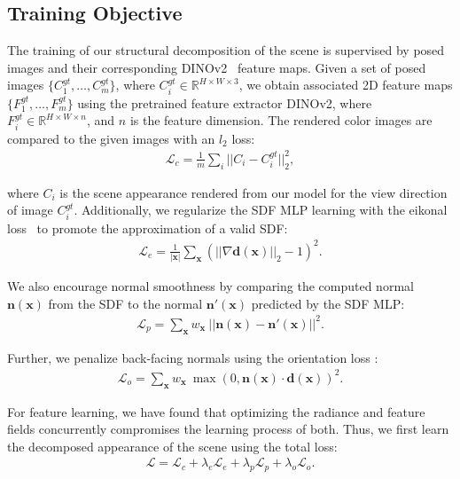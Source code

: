 \subsection{Training Objective}
\label{sec:training_objective}

The training of our structural decomposition of the scene is supervised by posed images and their corresponding DINOv2~\cite{oquab2023dinov2} feature maps. Given a set of posed images $\{C^{gt}_1, \dots, C^{gt}_m\}$, where $C^{gt}_i \in \mathbb{R}^{H \times W \times 3}$, we obtain associated 2D feature maps $\{F^{gt}_1, \dots, F^{gt}_m\}$ using the pretrained feature extractor DINOv2, where $F^{gt}_i \in \mathbb{R}^{H \times W \times n}$, and $n$ is the feature dimension.
The rendered color images are compared to the given images with an $l_2$ loss:
\begin{align}
\mathcal{L}_c = \frac{1}{m} \sum_i { || C_i - C^{gt}_i ||_2^2 },
\end{align}

\noindent where $C_i$ is the scene appearance rendered from our model for the view direction of image $C^{gt}_i$. Additionally, we regularize the SDF MLP learning with the eikonal loss~\cite{icml2020_2086, wang2023unisdf} to promote the approximation of a valid SDF:
\begin{align}
\mathcal{L}_{e} = \frac{1}{| \mathbf{x} |} \sum_{\mathbf{x}} {(|| \nabla \mathbf{d}(\mathbf{x}) ||_2 - 1)^2}.
\end{align}

We also encourage normal smoothness by comparing the computed normal $\mathbf{n}(\mathbf{x})$ from the SDF to the normal $\mathbf{n'}(\mathbf{x})$ predicted by the SDF MLP:
\begin{align}
\mathcal{L}_{p} = \sum_{\mathbf{x}} w_\mathbf{x} \: {|| \mathbf{n}(\mathbf{x}) - \mathbf{n'}(\mathbf{x})||^2}.
\end{align}

Further, we penalize back-facing normals using the orientation loss \cite{verbin2022refnerf}:
\begin{align}
\mathcal{L}_{o} = \sum_{\mathbf{x}} w_\mathbf{x} \: {\max(0, \mathbf{n}(\mathbf{x}) \cdot \mathbf{d}(\mathbf{x}))^2}.
\end{align}

For feature learning, we have found that optimizing the radiance and feature fields concurrently compromises the learning process of both. Thus, we first learn the decomposed appearance of the scene using the total loss:
\begin{align}
\mathcal{L} = \mathcal{L}_c + \lambda_e \mathcal{L}_e + \lambda_p \mathcal{L}_p + \lambda_o \mathcal{L}_o.
\end{align}


